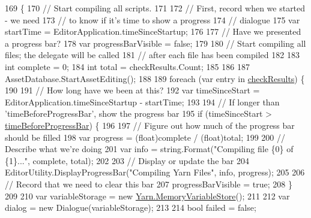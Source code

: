 \begin{DoxyCode}
169                                  \{
170             \textcolor{comment}{// Start compiling all scripts.}
171 
172             \textcolor{comment}{// First, record when we started - we need}
173             \textcolor{comment}{// to know if it's time to show a progress}
174             \textcolor{comment}{// dialogue}
175             var startTime = EditorApplication.timeSinceStartup;
176 
177             \textcolor{comment}{// Have we presented a progress bar?}
178             var progressBarVisible = \textcolor{keyword}{false};
179 
180             \textcolor{comment}{// Start compiling all files; the delegate will be called}
181             \textcolor{comment}{// after each file has been compiled}
182 
183             \textcolor{keywordtype}{int} complete = 0;
184             \textcolor{keywordtype}{int} total = checkResults.Count;
185 
186 
187             AssetDatabase.StartAssetEditing();
188 
189             \textcolor{keywordflow}{foreach} (var entry \textcolor{keywordflow}{in} \hyperlink{a00188_aa85ab7bd194e5425b991b9c216d4d10e}{checkResults}) \{
190 
191                 \textcolor{comment}{// How long have we been at this?}
192                 var timeSinceStart = EditorApplication.timeSinceStartup - startTime;
193 
194                 \textcolor{comment}{// If longer than 'timeBeforeProgressBar', show the progress bar}
195                 \textcolor{keywordflow}{if} (timeSinceStart > \hyperlink{a00188_a62a14b3fbaf2da41154ebad0eb7b6d3f}{timeBeforeProgressBar}) \{
196 
197                     \textcolor{comment}{// Figure out how much of the progress bar should be filled}
198                     var progress = (float)complete / (\textcolor{keywordtype}{float})total;
199 
200                     \textcolor{comment}{// Describe what we're doing}
201                     var info = string.Format(\textcolor{stringliteral}{"Compiling file \{0\} of \{1\}..."}, complete, total);
202 
203                     \textcolor{comment}{// Display or update the bar}
204                     EditorUtility.DisplayProgressBar(\textcolor{stringliteral}{"Compiling Yarn Files"}, info, progress);
205 
206                     \textcolor{comment}{// Record that we need to clear this bar}
207                     progressBarVisible = \textcolor{keyword}{true};
208                 \}
209 
210                 var variableStorage = \textcolor{keyword}{new} \hyperlink{a00138}{Yarn.MemoryVariableStore}();
211 
212                 var dialog = \textcolor{keyword}{new} Dialogue(variableStorage);
213 
214                 \textcolor{keywordtype}{bool} failed = \textcolor{keyword}{false};

\end{DoxyCode}
